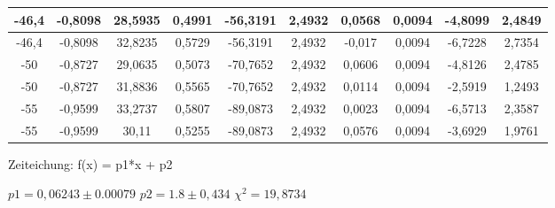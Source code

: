\documentclass[ngerman]{scrartcl} %
\begin{document}
\begin{table}
\begin{tabular}{c|c| c|c|c|c |c |c|c|c}
-46,4 & -0,8098 & 28,5935 & 0,4991 & -56,3191 & 2,4932 & 0,0568 & 0,0094 & -4,8099 & 2,4849 \\ \hline
-46,4 & -0,8098 & 32,8235 & 0,5729 & -56,3191 & 2,4932 & -0,017 & 0,0094 & -6,7228 & 2,7354 \\ \hline
-50 & -0,8727 & 29,0635 & 0,5073 & -70,7652 & 2,4932 & 0,0606 & 0,0094 & -4,8126 & 2,4785 \\ \hline
-50 & -0,8727 & 31,8836 & 0,5565 & -70,7652 & 2,4932 & 0,0114 & 0,0094 & -2,5919 & 1,2493 \\ \hline
-55 & -0,9599 & 33,2737 & 0,5807 & -89,0873 & 2,4932 & 0,0023 & 0,0094 & -6,5713 & 2,3587 \\ \hline
-55 & -0,9599 & 30,11 & 0,5255 & -89,0873 & 2,4932 & 0,0576 & 0,0094 & -3,6929 & 1,9761 \\ \hline
	\end{tabular}
\end{table}




 Zeiteichung:
  f(x) = p1*x + p2
  
  $  p1 =     0,06243 \pm 0.00079$
  $ p2 =         1.8  \pm 0,434$
 $\chi^2=19,8734$
 
 
\end{document}
